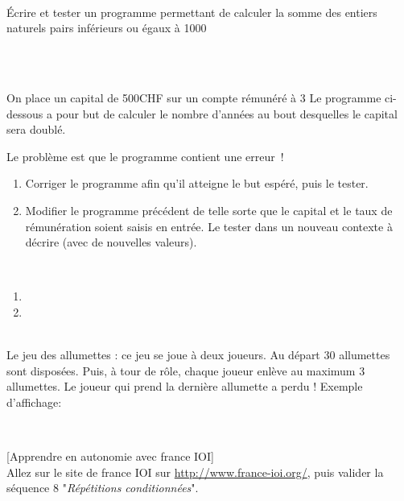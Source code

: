 \documentclass[a4paper,12pt]{article}
\begin{document}
\exo{}  ~\\ 
Écrire et tester un programme permettant de calculer la somme des entiers naturels pairs inférieurs ou égaux à 1000
\begin{correction}
	~\\ 
	
\end{correction}
\finexo

\exo{}  ~\\ 
On place un capital de 500CHF sur un compte rémunéré à 3%
Le programme ci-dessous a pour but de calculer le nombre d'années au bout desquelles le capital sera doublé. 

Le problème est que le programme contient une erreur !
\begin{enumerate}
	\item Corriger le programme afin qu’il atteigne le but espéré, puis le tester.
	\item Modifier le programme précédent de telle sorte que le capital et le taux de rémunération soient saisis en entrée. Le tester dans un nouveau contexte à décrire (avec de nouvelles valeurs).
\end{enumerate}
\begin{correction}
	~\\ 
	\begin{enumerate}
		\item 	
		\item 	
	\end{enumerate}
	
	
\end{correction}

\finexo

\exo{}  ~\\ 
Le jeu des allumettes : ce jeu se joue à deux joueurs. Au départ 30 allumettes sont disposées. Puis, à tour de rôle, chaque joueur enlève au maximum 3 allumettes. Le joueur qui prend la dernière allumette a perdu ! Exemple d’affichage: 
\begin{correction}
	~\\ 
	
\end{correction}
\finexo

\exo{}[Apprendre en  autonomie avec france IOI]  ~\\ 
Allez sur le site de france IOI sur \url{http://www.france-ioi.org/}, puis valider la séquence 8 "\textit{Répétitions conditionnées}".
\finexo
\end{document}
